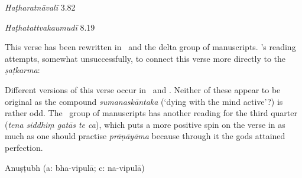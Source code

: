 \begin{ekdosis}

\begin{testimonia}[hp02_039]
\emph{Haṭharatnāvalī} 3.82

\begin{versinnote}
\end{versinnote}

\emph{Haṭhatattvakaumudī} 8.19

\begin{versinnote}
\end{versinnote}
\end{testimonia}

\begin{philcomm}[hp02_039]
This verse has been rewritten in \etaTwo\ and the delta group of manuscripts. \etaTwo's reading attempts, somewhat unsuccessfully, to connect this verse more directly to the \emph{ṣaṭkarma}:
\begin{versinnote}
\end{versinnote}
Different versions of this verse occur in \etaTwo\ and \epsilonThree. Neither of these appear to be original as the compound \emph{sumanaskāntaka} (`dying with the mind active'?) is rather odd. The \delta \ group of manuscripts has another reading for the third quarter (\emph{tena siddhiṃ gatās te ca}), which puts a more positive spin on the verse in as much as one should practise \emph{prāṇāyāma} because through it the gods attained perfection. 
\end{philcomm}

\begin{metre}[hp02_039]
Anuṣṭubh (a: bha-vipulā; c: na-vipulā)
\end{metre}


\end{ekdosis}
